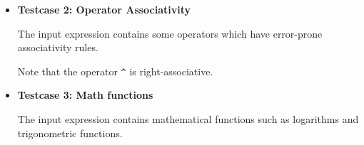 \documentclass{report}
\begin{document}
\begin{itemize}
\begin{table}[H]
{\begin{tabular}{c|c|c|c}
        \end{tabular}
        }
    \end{table}

    \item \textbf{Testcase 2: Operator Associativity}
    
    The input expression contains some operators which have error-prone
    associativity rules.
    \begin{table}[H]
        \centering
    \end{table}
    Note that the operator \quad \texttt{\^} is right-associative.

    \item \textbf{Testcase 3: Math functions}
    
    The input expression contains mathematical functions such as logarithms and trigonometric functions.
    \begin{table}[H]
        \centering
\end{table}
\end{itemize}
\end{document}
